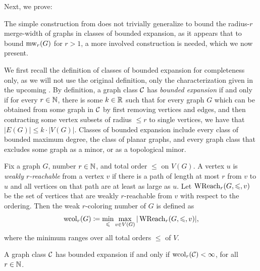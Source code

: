Next, we prove:
\beintro*

The simple construction from  does not trivially generalize to bound the radius-$r$ merge-width 
of graphs in classes of bounded expansion,
as it appears that to bound $\operatorname{mw}_r(G)$ for $r>1$, a more involved construction 
is needed, which we now present.

\medskip

We first recall the definition of classes of bounded expansion for completeness only, as we will not use the original definition, only the characterization given in the upcoming .
By definition,  a graph class $\mathcal C$ has \emph{bounded expansion} if and only if for every $r\in\mathbb N$,
there is some $k\in\mathbb R$ such that for every graph $G$
which can be obtained from some graph in $\mathcal C$ by first removing vertices and edges, and then contracting 
some vertex subsets of radius ${\le r}$ to single vertices, 
we have that $|E(G)|\le k\cdot |V(G)|$.
Classes of bounded expansion include every class of bounded maximum degree,
the class of planar graphs, and every graph class that excludes some graph  as a  minor, or as a topological minor.


Fix a graph $G$, number $r\in\mathbb N$, and total order $\le$ on $V(G)$. 
A vertex \(u\) is \emph{weakly \(r\)-reachable} from a vertex \(v\) if there is a path of length at most \(r\) from \(v\) 
to \(u\) and all vertices on that path are at least as large as \(u\).
Let \(\operatorname{WReach}_r(G,\leqslant,v)\) be the set of vertices that are weakly \(r\)-reachable from \(v\) with respect to the ordering.
Then the weak \(r\)-coloring number of \(G\) is defined as
\[
\operatorname{wcol}_r(G) \coloneqq \min_{\leqslant} \max_{v \in V(G)} |\operatorname{WReach}_r(G,\leqslant,v)|,
\]
where the minimum ranges over all total orders $\le$ of $V$.

\begin{lemma}\label{fact:be}
A graph class $\mathcal C$ has bounded expansion if and only if $\operatorname{wcol}_r(\mathcal C)<\infty$, for all~${r\in\mathbb N}$.
\end{lemma}




%
%

